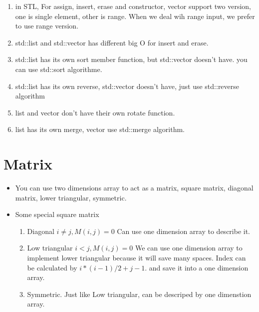 \documentclass[a4paper,11pt,twoside]{book}
\begin{document}
\begin{itemize}
\begin{enumerate}
\item in STL,  For assign, insert, erase and constructor, vector support two version, one is single element, other is range.  When we deal wih range input, we prefer to use range version. 
\item std::list and std::vector has different big O for insert and erase.
\item std::list has its own sort member function, but std::vector doesn't have. you can use std::sort algorithme. 
\item std::list has its own reverse,  std::vector doesn't have, just use std::reverse algorithm
\item list and vector don't have their own rotate function.
\item list has its own merge, vector use std::merge algorithm.

\end{enumerate}

\end{itemize}

\section{Matrix}
\begin{itemize}
\item You can use two dimensions array to act as a matrix, square matrix, diagonal matrix, lower triangular, symmetric. 
\item Some special square matrix
\begin{enumerate}
\item Diagonal  $i\neq j, M(i,j) = 0$ Can use one dimension array to describe it. 
\item Low triangular $i<j, M(i,j) = 0$ We can use one dimension array to implement lower triangular because it will save many spaces.  Index can be calculated by $i*(i-1)/2+j-1$. and save it into a one dimension array. 
\item Symmetric. Just like Low triangular, can be descriped by one dimenstion array. 
\end{enumerate}
\end{itemize}
\end{document}
